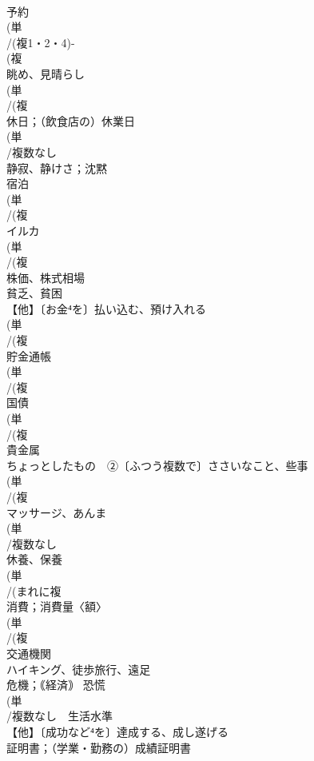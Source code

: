 \documentclass[8pt]{extreport}
\begin{document}
\begin{CJK}{UTF8}{min}
\\	予約
\\	(単
\\	/(複1・2・4)-
\\	(複
\\	眺め、見晴らし 
\\	(単
\\	/(複
\\	休日；（飲食店の）休業日
\\	(単
\\	/複数なし 
\\	静寂、静けさ；沈黙 
\\	宿泊
\\	(単
\\	/(複
\\	イルカ 
\\	(単
\\	/(複
\\	株価、株式相場
\\	貧乏、貧困 
\\	【他】〔お金⁴を〕払い込む、預け入れる
\\	(単
\\	/(複
\\	貯金通帳
\\	(単
\\	/(複
\\	国債
\\	(単
\\	/(複
\\	貴金属
\\	ちょっとしたもの　②〔ふつう複数で〕ささいなこと、些事
\\	(単
\\	/(複
\\	マッサージ、あんま 
\\	(単
\\	/複数なし　
\\	休養、保養
\\	(単
\\	/(まれに複
\\	消費；消費量〈額〉 
\\	(単
\\	/(複
\\	交通機関 
\\	ハイキング、徒歩旅行、遠足 
\\	危機；｟経済｠ 恐慌 
\\	(単
\\	/複数なし　生活水準
\\	【他】〔成功など⁴を〕達成する、成し遂げる
\\	証明書；（学業・勤務の）成績証明書

\end{CJK}
\end{document}
